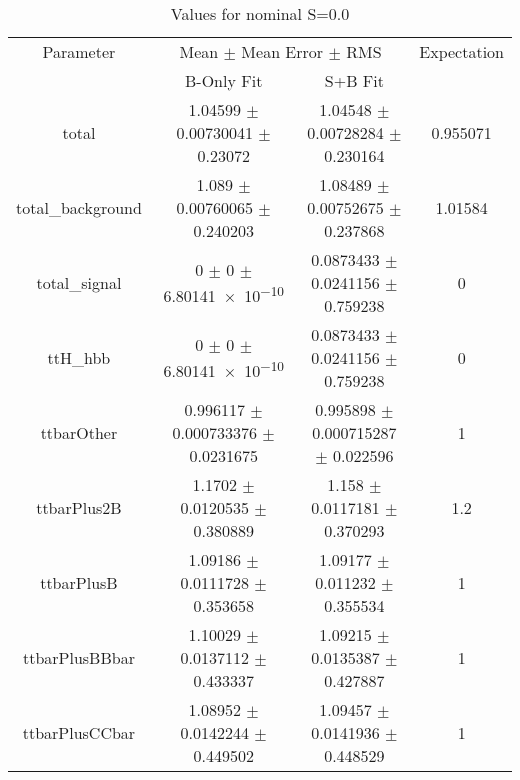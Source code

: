 \begin{table}
\centering
\caption{Values for nominal S=0.0}
\begin{tabular}{cccc}
\toprule
Parameter & \multicolumn{2}{c}{Mean $\pm$ Mean Error $\pm$ RMS} & Expectation\\
 & B-Only Fit & S+B Fit & \\
\midrule
total & \num{1.04599} $\pm$ \num{0.00730041} $\pm$ \num{0.23072} & \num{1.04548} $\pm$ \num{0.00728284} $\pm$ \num{0.230164} & \num{0.955071}\\
total\_background & \num{1.089} $\pm$ \num{0.00760065} $\pm$ \num{0.240203} & \num{1.08489} $\pm$ \num{0.00752675} $\pm$ \num{0.237868} & \num{1.01584}\\
total\_signal & \num{0} $\pm$ \num{0} $\pm$ \num{6.80141e-10} & \num{0.0873433} $\pm$ \num{0.0241156} $\pm$ \num{0.759238} & \num{0}\\
ttH\_hbb & \num{0} $\pm$ \num{0} $\pm$ \num{6.80141e-10} & \num{0.0873433} $\pm$ \num{0.0241156} $\pm$ \num{0.759238} & \num{0}\\
ttbarOther & \num{0.996117} $\pm$ \num{0.000733376} $\pm$ \num{0.0231675} & \num{0.995898} $\pm$ \num{0.000715287} $\pm$ \num{0.022596} & \num{1}\\
ttbarPlus2B & \num{1.1702} $\pm$ \num{0.0120535} $\pm$ \num{0.380889} & \num{1.158} $\pm$ \num{0.0117181} $\pm$ \num{0.370293} & \num{1.2}\\
ttbarPlusB & \num{1.09186} $\pm$ \num{0.0111728} $\pm$ \num{0.353658} & \num{1.09177} $\pm$ \num{0.011232} $\pm$ \num{0.355534} & \num{1}\\
ttbarPlusBBbar & \num{1.10029} $\pm$ \num{0.0137112} $\pm$ \num{0.433337} & \num{1.09215} $\pm$ \num{0.0135387} $\pm$ \num{0.427887} & \num{1}\\
ttbarPlusCCbar & \num{1.08952} $\pm$ \num{0.0142244} $\pm$ \num{0.449502} & \num{1.09457} $\pm$ \num{0.0141936} $\pm$ \num{0.448529} & \num{1}\\
\bottomrule
\end{tabular}
\end{table}